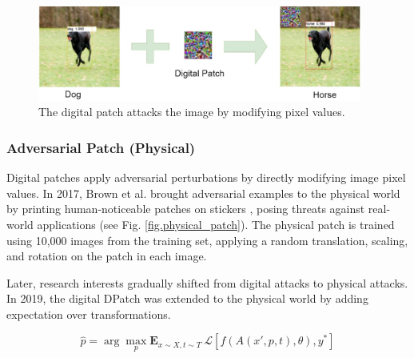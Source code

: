 \begin{figure}[H]
\centering
\includegraphics[width=0.95\textwidth]{figures/chapter_intro/digital_patch.jpg}
\caption{The digital patch attacks the image by modifying pixel values.}
\label{fig.digital_patch}
\end{figure}






\subsubsection{Adversarial Patch (Physical)}

Digital patches apply adversarial perturbations by directly modifying image pixel values. In 2017, Brown et al. brought adversarial examples to the physical world by printing human-noticeable patches on stickers \citep{brown2017adversarial}, posing threats against real-world applications (see Fig. \ref{fig.physical_patch}). The physical patch is trained using 10,000 images from the training set, applying a random translation, scaling, and rotation on the patch in each image.

Later, research interests gradually shifted from digital attacks to physical attacks. In 2019, the digital DPatch \citep{liu2018dpatch} was extended to the physical world \citep{lee2019physical} by adding expectation over transformations.

\begin{equation}
\hat{p} = \arg \underset{p}{\max}\mathbf{E}_{x \sim X, t \sim T}\ \mathcal{L}[f(A(x', p, t), \theta), y^*]
\end{equation}

